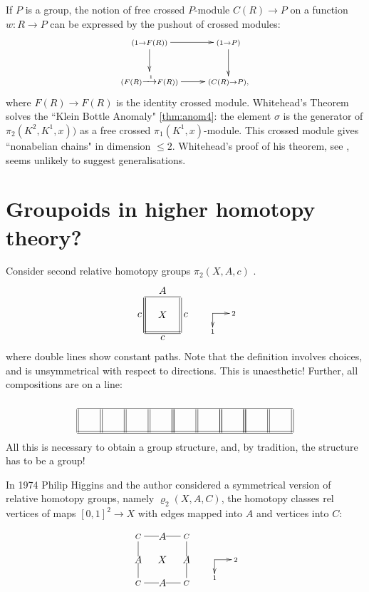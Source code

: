 \documentclass{elsarticle}
\makeatletter
\newcommand{\xdirects}[2]{\def\objectstyle{\scriptstyle}  \objectmargin={0pt}
\xy
(0,0)*+{}="a",(0,-6)*+{\rule{0em}{1.5ex}#2}="b",(7,0)*+{\;#1}="c"
\ar@{->} "a";"b" \ar @{->}"a";"c" \endxy }
\def\rho{\varrho}
\def\xybiglabels{\def\labelstyle{\textstyle}}
\makeatother
\begin{document}
If $P$   is a group, the notion of free crossed $P$-module $C(R) \to  P$  on a function $ w : R \to  P$
can be expressed by the pushout of crossed modules:
\begin{equation}\label{eqn:freexmod}
\vcenter{\xymatrix{\ar [r] \ar [d]   (1 \to F(R)) & \ar [d] (1 \to P)\\
\ar [r] (F(R)\xrightarrow{\;\; 1} F(R)) & (C(R) \to P)  ,   }  }
\end{equation}
where $F (R) \to F (R)$  is the identity crossed module.  Whitehead's Theorem solves the ``Klein
Bottle Anomaly"  \ref{thm:anom4}: the element $\sigma$  is the generator of $\pi_2(K ^2 , K^ 1 , x))$  as a free crossed $\pi_1(K^1,x)$-module.
This crossed module gives ``nonabelian chains" in dimension $\leqslant  2$. Whitehead's proof
of his theorem, see \cite{B80},  seems unlikely to suggest generalisations.

\section{Groupoids in higher homotopy theory?} \label{sec:gpdshhom}
Consider second relative homotopy groups $\pi _2 (X, A, c)$ .
\[\vcenter{\xybiglabels
\xymatrix@M=0pt@=3pc{\ar @{-}[r]^A \ar@{}[dr]|X \ar @{=}[d]_c \ar
@{=} [d] & \ar @{=}[d]^c
  \\
\ar @{=}[r]_c& }}\qquad \xdirects{2}{1} \]
where double lines show constant paths.   Note that the definition involves {choices},  and is unsymmetrical with respect to
directions.   This is unaesthetic! Further, all compositions are on a line:

$$\xymatrix@M=0pt@=2pc {\ar@{-}[rrrrrrrrr]\ar @{=}
[d] &\ar @{=} [d]  &\ar @{=}[d]   &\ar
@{=} [d]  & \ar @{=} [d] \ar
@{=} [d] &\ar @{=} [d]
&\ar @{=} [d] \ar @{=} [d] &\ar @{=} [d]
\ar @{=} [d] &\ar @{=} [d]
&\ar @{=} [d] \\
\ar@{=}[rrrrrrrrr]&&&&&& &&&} $$
All this is necessary to obtain a group structure, and, by tradition, the structure  has to be a group!

In 1974 Philip Higgins and the author considered a symmetrical version of relative homotopy groups, namely  $\rho_2(X,A,C)$, the   homotopy classes
rel vertices of maps $[0,1]^2 \to X$ with edges mapped into $A$ and
vertices into $C$:




 \[\vcenter{\xybiglabels
\xymatrix @=3pc{ \ar @{}[dr]|X \ar @{-}[r]|A  C
 \ar @{-} [d]|A    & \ar @{-}[d] |A  C \\ \ar @{-}[r]|A C& C}}\qquad \xdirects{2}{1}  \]
\end{document}
